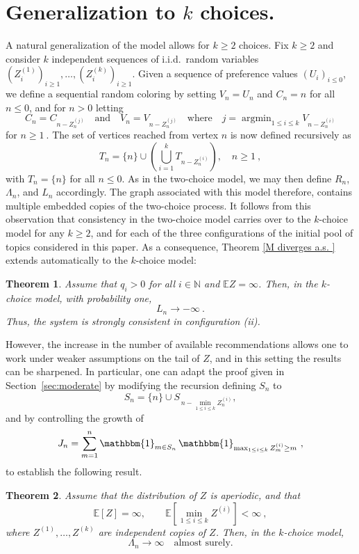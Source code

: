 \documentclass[12pt]{article}
\newcommand{\N}{\mathbb{N}}
\newcommand{\E}{\mathbb{E}}
\newtheorem{theorem}{Theorem}
\numberwithin{equation}{section} \font\titre=cmbx12
\def\IND{\mathbbm{1}}
\newcommand{\argmin}{\mathop{\mathrm{argmin}}}
\newcommand{\leftmost}{L}
\newcommand{\rightmost}{R}
\newcommand{\leaves}{\Lambda}
\begin{document}
\section{Generalization to $k$ choices.}
\color{black}
A natural generalization of the model allows for $k \ge 2$ choices. Fix $k\ge 2$ and consider $k$ independent sequences of i.i.d.\ random variables $(Z_i^{(1)})_{i \ge 1}, \dots , (Z_i^{(k)})_{i \ge 1}$. Given a sequence of preference values $(U_i)_{i \le 0}$, we define a sequential random coloring by setting $V_n = U_n$ and $C_n = n$ for all $n \le 0$, and for $n > 0$ letting
\[
C_n = C_{n-Z_n^{(j)}} \quad \text{and} \quad V_n = V_{n-Z_n^{(j)}} \quad \text{where} \quad j = \argmin_{1 \le i \le k} V_{n-Z_n^{(i)}}
\]
for $n \ge 1~.$
The set of vertices reached from vertex $n$ is now defined recursively as  
\[
T_n = \{n\} \cup \left(\bigcup_{i=1}^k T_{n-Z_n^{(i)}} \right), \quad n \ge 1~,
\]
with $T_n = \{n\}$ for all $n \le 0$. As in the two-choice model, we may then define $\rightmost_n$, $\leaves_n$, and $\leftmost_n$ accordingly. The graph associated with this model therefore, contains multiple embedded copies of the two-choice process.  It follows from this observation that consistency in the two-choice model carries over to the $k$-choice model for any $k \ge 2$, and for each of the three configurations of the initial pool of topics considered in this paper. As a consequence, Theorem \ref{M diverges a.s. } extends automatically to the $k$-choice model: 
\begin{theorem}
    Assume that $q_i>0$ for all $i\in \N$ and $\E Z=\infty$. Then, in the $k$-choice model, with
    probability one, $$\leftmost_n\to -\infty~.$$
Thus, the system is strongly consistent in configuration (ii).
\end{theorem}


However, the increase in the number of available recommendations allows one to work under weaker assumptions on the tail of $Z$, and in this setting the results can be sharpened. 
In particular, one can adapt the proof given in Section~\ref{sec:moderate} by modifying the recursion defining $S_n$ to
\[
S_n = \{n\} \cup S_{\,n-\min_{1\le i \le k} Z_n^{(i)}},
\]
and by controlling the growth of 
\[
J_n = \sum_{m=1}^n \IND_{m \in S_n}\,\IND_{\max_{1\le i \le k} Z_m^{(i)} \ge m}~,
\]
to establish the following result.  

\begin{theorem}
    Assume that the distribution of $Z$ is aperiodic, and that 
    \[
    \E[Z] = \infty, \qquad \E\!\left[\min_{1\le i \le k} Z^{(i)}\right] < \infty~,
    \]
    where $Z^{(1)}, \dots, Z^{(k)}$ are independent copies of $Z$.  
    Then, in the $k$-choice model,  
    \[
    \leaves_n \to \infty \quad \text{almost surely.}
    \]
\end{theorem}
\end{document}
